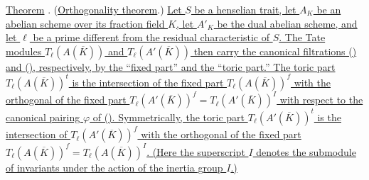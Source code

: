 \medskip
\noindent
\underline{Theorem} . (\underline{Orthogonality theorem}.)
\underline{Let $S$ be a henselian trait, let $A_K$ be an abelian scheme
over its fraction field $K$, let $A'_K$ be the dual abelian scheme, and
let $\ell$ be a prime different from the residual characteristic of
$S$.  The Tate modules $T_\ell(A(\overline K))$ and
$T_\ell(A'(\overline K))$ then carry the canonical filtrations ()
and (), respectively, by the ``fixed part'' and the ``toric
part.''  The toric part $T_\ell(A(\overline K))^t$ is the intersection
of the fixed part $T_\ell(A(\overline K))^f$ with the orthogonal of the
fixed part
$T_\ell(A'(\overline K))^f=T_\ell(A'(\overline K))^I$ with respect to
the canonical pairing $\varphi$ of ().  Symmetrically, the toric
part $T_\ell(A'(\overline K))^t$ is the intersection of
$T_\ell(A'(\overline K))^f$ with the orthogonal of the fixed part
$T_\ell(A(\overline K))^f=T_\ell(A(\overline K))^I$.  (Here the
superscript $I$ denotes the submodule of invariants under the action of
the inertia group $I$.)}

